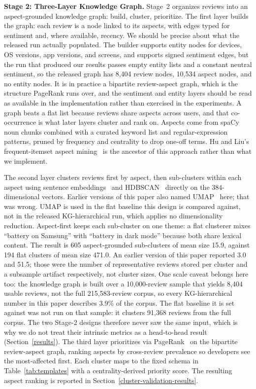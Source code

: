 \documentclass[preprint,12pt]{elsarticle}
\begin{document}
  \textbf{Stage 2: Three-Layer Knowledge Graph.} Stage~2 organizes
  reviews into an aspect-grounded knowledge graph: build, cluster,
  prioritize. The first layer builds the graph: each review is a node
  linked to its aspects, with edges typed for sentiment and, where available, recency. We should
  be precise about what the released run actually populated. The builder supports entity nodes for
  devices, OS versions, app versions, and screens, and supports signed sentiment edges, but the
  run that produced our results passes empty entity lists and a constant neutral sentiment, so the
  released graph has 8{,}404 review nodes, 10{,}534 aspect nodes, and no entity nodes. It is in
  practice a bipartite review-aspect graph, which is the structure PageRank runs over, and the
  sentiment and entity layers should be read as available in the implementation rather than
  exercised in the experiments. A
  graph beats a flat list because reviews share aspects across users,
  and that co-occurrence is what later layers cluster and rank on.
  Aspects come from spaCy noun chunks combined with a curated keyword list and
  regular-expression patterns, pruned by frequency and centrality to drop one-off terms. Hu and
  Liu's frequent-itemset aspect mining~\cite{hu2004mining} is the ancestor of this approach
  rather than what we implement.

  The second layer clusters reviews first by aspect, then sub-clusters
  within each aspect using sentence embeddings~\cite{reimers2019sentence} and
  HDBSCAN~\cite{mcinnes2017hdbscan} directly on the 384-dimensional vectors. Earlier versions of
  this paper also named UMAP~\cite{mcinnes2018umap} here; that was wrong. UMAP is used in the flat
  baseline this design is compared against, not in the released KG-hierarchical run, which applies
  no dimensionality reduction. Aspect-first keeps each
  sub-cluster on one theme: a flat clusterer mixes ``battery on Samsung''
  with ``battery in dark mode'' because both share lexical content. The result is 605 aspect-grounded sub-clusters of mean size 15.9, against 194 flat clusters of
  mean size 471.0. An earlier version of this paper reported 3.0 and 51.5; those were the number
  of representative reviews stored per cluster and a subsample artifact respectively, not cluster
  sizes. One scale caveat belongs here too: the knowledge graph is built over a 10{,}000-review
  sample that yields 8{,}404 usable reviews, not the full 215{,}583-review corpus, so every
  KG-hierarchical number in this paper describes 3.9\% of the corpus. The flat baseline it is set
  against was not run on that sample: it clusters 91{,}368 reviews from the full corpus. The two
  Stage-2 designs therefore never saw the same input, which is why we do not treat their intrinsic
  metrics as a head-to-head result (Section~\ref{results}). The third layer prioritizes via
  PageRank~\cite{brin1998anatomy, page1999pagerank} on the bipartite
  review-aspect graph, ranking aspects by cross-review prevalence so
  developers see the most-affected first. Each
  cluster maps to the fixed schema in Table~\ref{tab:templates} with a
  centrality-derived priority score. The resulting aspect ranking is reported in
  Section~\ref{cluster-validation-results}.
\end{document}
